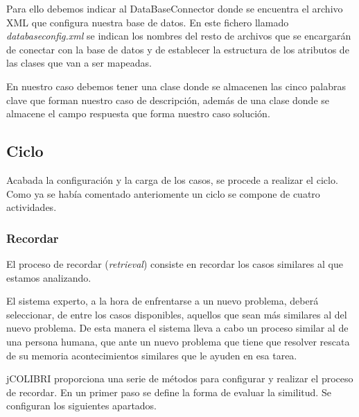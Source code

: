 Para ello debemos indicar al DataBaseConnector donde se encuentra el archivo XML que configura nuestra base de datos. En este fichero llamado \emph{databaseconfig.xml} se indican los nombres del resto de archivos que se encargarán de conectar con la base de datos y de establecer la estructura de los atributos de las clases que van a ser mapeadas.

En nuestro caso debemos tener una clase donde se almacenen las cinco palabras clave que forman nuestro caso de descripción, además de una clase donde se almacene el campo respuesta que forma nuestro caso solución.

\subsection{Ciclo}\label{ciclo}

Acabada la configuración y la carga de los casos, se procede a realizar el ciclo. Como ya se había comentado anteriomente un ciclo se compone de cuatro actividades.


\subsubsection{Recordar}\label{recordar}

El proceso de recordar (\emph{retrieval}) consiste en recordar los casos similares al que estamos analizando.

El sistema experto, a la hora de enfrentarse a un nuevo problema, deberá seleccionar, de entre los casos disponibles, aquellos que sean más similares al del nuevo problema. De esta manera el sistema lleva a cabo un proceso similar al de una persona humana, que ante un nuevo problema que tiene que resolver rescata de su memoria acontecimientos similares que le ayuden en esa tarea.

jCOLIBRI proporciona una serie de métodos para configurar y realizar el proceso de recordar. 
En un primer paso se define la forma de evaluar la similitud. Se configuran los siguientes apartados.

